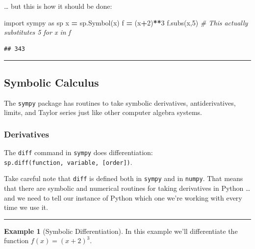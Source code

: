 \documentclass[
]{book}
\newenvironment{Shaded}{\begin{snugshade}}{\end{snugshade}}
\newcommand{\CommentTok}[1]{\textcolor[rgb]{0.56,0.35,0.01}{\textit{#1}}}
\newcommand{\DecValTok}[1]{\textcolor[rgb]{0.00,0.00,0.81}{#1}}
\newcommand{\ImportTok}[1]{#1}
\newcommand{\NormalTok}[1]{#1}
\newcommand{\OperatorTok}[1]{\textcolor[rgb]{0.81,0.36,0.00}{\textbf{#1}}}
\newcommand{\StringTok}[1]{\textcolor[rgb]{0.31,0.60,0.02}{#1}}
\theoremstyle{definition}
\theoremstyle{definition}
\newtheorem{example}{Example}[chapter]
\theoremstyle{definition}
\theoremstyle{remark}
\begin{document}
\ldots{} but this is how it should be done:

\begin{Shaded}
\begin{Highlighting}[]
\ImportTok{import}\NormalTok{ sympy }\ImportTok{as}\NormalTok{ sp}
\NormalTok{x }\OperatorTok{=}\NormalTok{ sp.Symbol(}\StringTok{\textquotesingle{}x\textquotesingle{}}\NormalTok{)}
\NormalTok{f }\OperatorTok{=}\NormalTok{ (x}\OperatorTok{+}\DecValTok{2}\NormalTok{)}\OperatorTok{**}\DecValTok{3}
\NormalTok{f.subs(x,}\DecValTok{5}\NormalTok{) }\CommentTok{\# This actually substitutes 5 for x in f}
\end{Highlighting}
\end{Shaded}

\begin{verbatim}
## 343
\end{verbatim}

\begin{center}\rule{0.5\linewidth}{0.5pt}\end{center}

\hypertarget{symbolic-calculus}{%
\subsection{Symbolic Calculus}\label{symbolic-calculus}}

The \texttt{sympy} package has routines to take symbolic derivatives, antiderivatives, limits, and Taylor series just like other computer algebra systems.

\hypertarget{derivatives}{%
\subsubsection{Derivatives}\label{derivatives}}

The \texttt{diff} command in \texttt{sympy} does differentiation: \texttt{sp.diff(function,\ variable,\ {[}order{]})}.

Take careful note that \texttt{diff} is defined both in \texttt{sympy} and in \texttt{numpy}. That means that there are symbolic and numerical routines for taking derivatives in Python \ldots and we need to tell our instance of Python which one we're working with every time we use it.

\begin{center}\rule{0.5\linewidth}{0.5pt}\end{center}

\begin{example}[Symbolic Differentiation]
\protect\hypertarget{exm:unnamed-chunk-794}{}{\label{exm:unnamed-chunk-794} {} }In this example we'll differentiate the function \(f(x) = (x+2)^3\).
\end{example}
\end{document}
